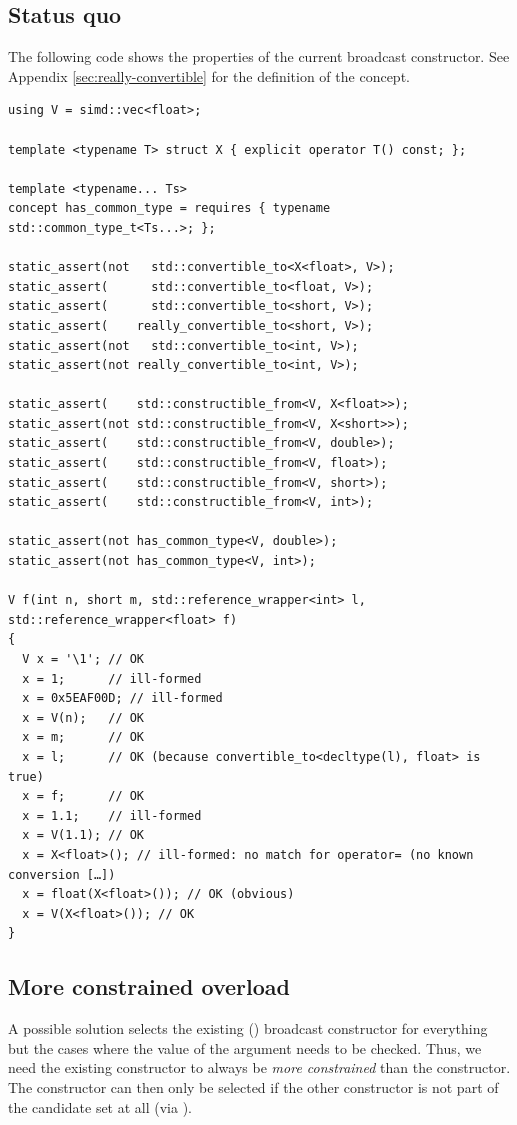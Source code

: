 \subsection{Status quo}
The following code shows the properties of the current broadcast constructor.
See Appendix \ref{sec:really-convertible} for the definition of the 
concept.

\bigskip
\begin{lstlisting}[style=Vc]
using V = simd::vec<float>;

template <typename T> struct X { explicit operator T() const; };

template <typename... Ts>
concept has_common_type = requires { typename std::common_type_t<Ts...>; };

static_assert(not   std::convertible_to<X<float>, V>);
static_assert(      std::convertible_to<float, V>);
static_assert(      std::convertible_to<short, V>);
static_assert(    really_convertible_to<short, V>);
static_assert(not   std::convertible_to<int, V>);
static_assert(not really_convertible_to<int, V>);

static_assert(    std::constructible_from<V, X<float>>);
static_assert(not std::constructible_from<V, X<short>>);
static_assert(    std::constructible_from<V, double>);
static_assert(    std::constructible_from<V, float>);
static_assert(    std::constructible_from<V, short>);
static_assert(    std::constructible_from<V, int>);

static_assert(not has_common_type<V, double>);
static_assert(not has_common_type<V, int>);

V f(int n, short m, std::reference_wrapper<int> l, std::reference_wrapper<float> f)
{
  V x = '\1'; // OK
  x = 1;      // ill-formed
  x = 0x5EAF00D; // ill-formed
  x = V(n);   // OK
  x = m;      // OK
  x = l;      // OK (because convertible_to<decltype(l), float> is true)
  x = f;      // OK
  x = 1.1;    // ill-formed
  x = V(1.1); // OK
  x = X<float>(); // ill-formed: no match for operator= (no known conversion […])
  x = float(X<float>()); // OK (obvious)
  x = V(X<float>()); // OK
}
\end{lstlisting}

\subsection{More constrained  overload}\label{sec:explicit}
A possible solution selects the existing () broadcast constructor for
everything but the cases where the value of the argument needs to be checked.
Thus, we need the existing constructor to always be \emph{more constrained} 
than the  constructor.
The  constructor can then only be selected if the other constructor is not part of
the candidate set at all (via ).

